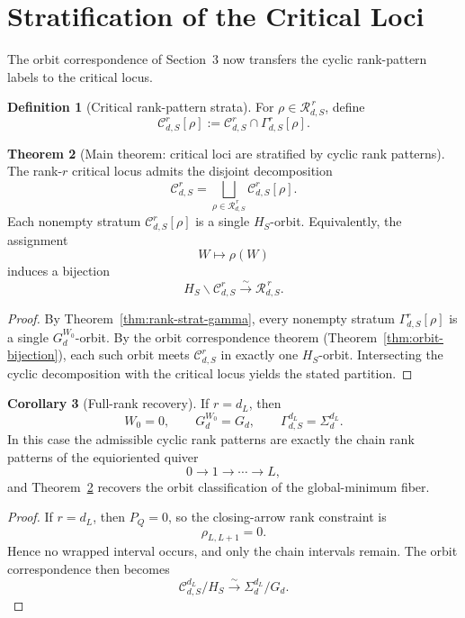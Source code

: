 \documentclass[11pt]{article}
\theoremstyle{definition}
\newtheorem{theorem}{Theorem}[section]
\newtheorem{corollary}[theorem]{Corollary}
\newtheorem{definition}[theorem]{Definition}
\begin{document}
\section{Stratification of the Critical Loci}

The orbit correspondence of Section~3 now transfers the cyclic rank-pattern
labels to the critical locus.

\begin{definition}[Critical rank-pattern strata]
For \(\rho\in \mathcal R_{d,S}^{\,r}\), define
\[
\mathcal C_{d,S}^r[\rho]
:=
\mathcal C_{d,S}^r\cap \Gamma_{d,S}^r[\rho].
\]
\end{definition}

\begin{theorem}[Main theorem: critical loci are stratified by cyclic rank patterns]
\label{thm:main}
The rank-\(r\) critical locus admits the disjoint decomposition
\[
\mathcal C_{d,S}^r
=
\bigsqcup_{\rho\in \mathcal R_{d,S}^{\,r}}
\mathcal C_{d,S}^r[\rho].
\]
Each nonempty stratum \(\mathcal C_{d,S}^r[\rho]\) is a single \(H_S\)-orbit.
Equivalently, the assignment
\[
W\longmapsto \rho(W)
\]
induces a bijection
\[
H_S\backslash \mathcal C_{d,S}^r
\xrightarrow{\sim}
\mathcal R_{d,S}^{\,r}.
\]
\end{theorem}

\begin{proof}
By Theorem~\ref{thm:rank-strat-gamma}, every nonempty stratum
\(\Gamma_{d,S}^r[\rho]\) is a single \(G_d^{W_0}\)-orbit. By the orbit
correspondence theorem (Theorem~\ref{thm:orbit-bijection}), each such orbit
meets \(\mathcal C_{d,S}^r\) in exactly one \(H_S\)-orbit. Intersecting the
cyclic decomposition with the critical locus yields the stated partition.
\end{proof}

\begin{corollary}[Full-rank recovery]
\label{cor:full-rank}
If \(r=d_L\), then
\[
W_0=0,
\qquad
G_d^{W_0}=G_d,
\qquad
\Gamma_{d,S}^{d_L}=\Sigma_d^{d_L}.
\]
In this case the admissible cyclic rank patterns are exactly the chain rank
patterns of the equioriented quiver
\[
0\to 1\to \cdots \to L,
\]
and Theorem~\ref{thm:main} recovers the orbit classification of the global-minimum
fiber.
\end{corollary}

\begin{proof}
If \(r=d_L\), then \(P_Q=0\), so the closing-arrow rank constraint is
\[
\rho_{L,L+1}=0.
\]
Hence no wrapped interval occurs, and only the chain intervals remain. The orbit
correspondence then becomes
\[
\mathcal C_{d,S}^{d_L}/H_S \xrightarrow{\sim} \Sigma_d^{d_L}/G_d.
\]
\end{proof}
\end{document}
